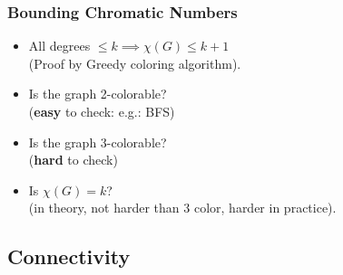 \documentclass{beamer}
\begin{document}
\begin{frame}
  \frametitle{Bounding Chromatic Numbers}

  {\larger

    \begin{itemize}
    \item All degrees $\leq k \implies \chi(G) \leq k+1$\\
      \hfill (Proof by Greedy coloring algorithm).

      \bigskip

    \item Is the graph 2-colorable?\\
      \hfill ({\bf easy} to check: e.g.: BFS)

      \bigskip
      
    \item Is the graph 3-colorable?\\
      \hfill ({\bf hard} to check)

      \bigskip

    \item Is $\chi(G) = k$?\\
      \hfill (in theory, not harder than 3 color, harder in practice).
      
    \end{itemize}

  }
\end{frame}

\subsection{Connectivity}
\end{document}
